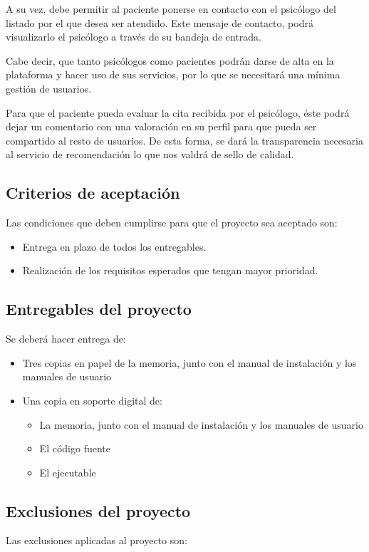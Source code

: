 A su vez, debe permitir al paciente ponerse en contacto con el psicólogo del listado por el que desea ser atendido. Este mensaje de contacto, podrá visualizarlo el psicólogo a través de su bandeja de entrada. 


Cabe decir, que tanto psicólogos como pacientes podrán darse de alta en la plataforma y hacer uso de sus servicios, por lo que se necesitará una mínima gestión de usuarios. 


Para que el paciente pueda evaluar la cita recibida por el psicólogo, éste podrá dejar un comentario con una valoración en su perfil para que pueda ser compartido al resto de usuarios. De esta forma, se dará la transparencia necesaria al servicio de recomendación lo que nos valdrá de sello de calidad.

\subsection{Criterios de aceptación}
Las condiciones que deben cumplirse para que el proyecto sea aceptado son:

\begin{itemize}
\item Entrega en plazo de todos los entregables.
\item Realización de los requisitos esperados que tengan mayor prioridad.
\end{itemize}

\subsection{Entregables del proyecto}
Se deberá hacer entrega de:

\begin{itemize}
\item Tres copias en papel de la memoria, junto con el manual de instalación y los manuales de usuario
\item Una copia en soporte digital de:
	\begin{itemize}
		\item La memoria, junto con el manual de instalación y los manuales de usuario
		\item El código fuente
		\item El ejecutable
	\end{itemize}
\end{itemize}

\subsection{Exclusiones del proyecto}
Las exclusiones aplicadas al proyecto son:

